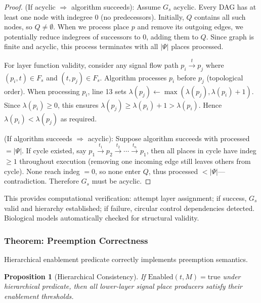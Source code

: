 \documentclass[10pt,letterpaper]{article}
\newtheorem{proposition}{Proposition}
\begin{document}
\begin{proof}
(If acyclic $\Rightarrow$ algorithm succeeds): Assume $G_s$ acyclic. Every DAG has at least one node with indegree 0 (no predecessors). Initially, $Q$ contains all such nodes, so $Q \neq \emptyset$. When we process place $p$ and remove its outgoing edges, we potentially reduce indegrees of successors to 0, adding them to $Q$. Since graph is finite and acyclic, this process terminates with all $|\Psi|$ places processed.

For layer function validity, consider any signal flow path $p_i \xrightarrow{t} p_j$ where $(p_i,t) \in F_s$ and $(t,p_j) \in F_s$. Algorithm processes $p_i$ before $p_j$ (topological order). When processing $p_i$, line 13 sets $\lambda(p_j) \leftarrow \max(\lambda(p_j), \lambda(p_i) + 1)$. Since $\lambda(p_i) \geq 0$, this ensures $\lambda(p_j) \geq \lambda(p_i) + 1 > \lambda(p_i)$. Hence $\lambda(p_i) < \lambda(p_j)$ as required.

(If algorithm succeeds $\Rightarrow$ acyclic): Suppose algorithm succeeds with processed $= |\Psi|$. If cycle existed, say $p_1 \xrightarrow{t_1} p_2 \xrightarrow{t_2} \cdots \xrightarrow{t_n} p_1$, then all places in cycle have indeg $\geq 1$ throughout execution (removing one incoming edge still leaves others from cycle). None reach indeg $= 0$, so none enter $Q$, thus processed $< |\Psi|$---contradiction. Therefore $G_s$ must be acyclic.
\end{proof}

This provides computational verification: attempt layer assignment; if success, $G_s$ valid and hierarchy established; if failure, circular control dependencies detected. Biological models automatically checked for structural validity.

\subsubsection{Theorem: Preemption Correctness}

Hierarchical enablement predicate correctly implements preemption semantics.

\begin{proposition}[Hierarchical Consistency]
If $\text{Enabled}(t, M) = \text{true}$ under hierarchical predicate, then all lower-layer signal place producers satisfy their enablement thresholds.
\end{proposition}
\end{document}
